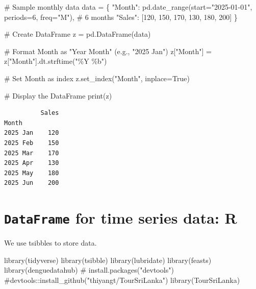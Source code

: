 \documentclass[
  11pt,
  a4paper,
]{report}
\newenvironment{Shaded}{\begin{snugshade}}{\end{snugshade}}
\newcommand{\BuiltInTok}[1]{\textcolor[rgb]{0.00,0.23,0.31}{#1}}
\newcommand{\CommentTok}[1]{\textcolor[rgb]{0.37,0.37,0.37}{#1}}
\newcommand{\DecValTok}[1]{\textcolor[rgb]{0.68,0.00,0.00}{#1}}
\newcommand{\FunctionTok}[1]{\textcolor[rgb]{0.28,0.35,0.67}{#1}}
\newcommand{\NormalTok}[1]{\textcolor[rgb]{0.00,0.23,0.31}{#1}}
\newcommand{\OperatorTok}[1]{\textcolor[rgb]{0.37,0.37,0.37}{#1}}
\newcommand{\StringTok}[1]{\textcolor[rgb]{0.13,0.47,0.30}{#1}}
\newcommand{\VariableTok}[1]{\textcolor[rgb]{0.07,0.07,0.07}{#1}}
\begin{document}
\begin{Shaded}
\begin{Highlighting}[]
\CommentTok{\# Sample monthly data}
\NormalTok{data }\OperatorTok{=}\NormalTok{ \{}
    \StringTok{"Month"}\NormalTok{: pd.date\_range(start}\OperatorTok{=}\StringTok{"2025{-}01{-}01"}\NormalTok{, periods}\OperatorTok{=}\DecValTok{6}\NormalTok{, freq}\OperatorTok{=}\StringTok{"M"}\NormalTok{),  }\CommentTok{\# 6 months}
    \StringTok{"Sales"}\NormalTok{: [}\DecValTok{120}\NormalTok{, }\DecValTok{150}\NormalTok{, }\DecValTok{170}\NormalTok{, }\DecValTok{130}\NormalTok{, }\DecValTok{180}\NormalTok{, }\DecValTok{200}\NormalTok{]}
\NormalTok{\}}

\CommentTok{\# Create DataFrame}
\NormalTok{z }\OperatorTok{=}\NormalTok{ pd.DataFrame(data)}

\CommentTok{\# Format Month as "Year Month" (e.g., "2025 Jan")}
\NormalTok{z[}\StringTok{"Month"}\NormalTok{] }\OperatorTok{=}\NormalTok{ z[}\StringTok{"Month"}\NormalTok{].dt.strftime(}\StringTok{"\%Y \%b"}\NormalTok{)}

\CommentTok{\# Set Month as index}
\NormalTok{z.set\_index(}\StringTok{"Month"}\NormalTok{, inplace}\OperatorTok{=}\VariableTok{True}\NormalTok{)}

\CommentTok{\# Display the DataFrame}
\BuiltInTok{print}\NormalTok{(z)}
\end{Highlighting}
\end{Shaded}

\begin{verbatim}
          Sales
Month          
2025 Jan    120
2025 Feb    150
2025 Mar    170
2025 Apr    130
2025 May    180
2025 Jun    200
\end{verbatim}

\section{\texorpdfstring{\texttt{DataFrame} for time series data:
R}{DataFrame for time series data: R}}\label{dataframe-for-time-series-data-r}

We use tsibbles to store data.

\begin{Shaded}
\begin{Highlighting}[]
\FunctionTok{library}\NormalTok{(tidyverse)}
\FunctionTok{library}\NormalTok{(tsibble)}
\FunctionTok{library}\NormalTok{(lubridate)}
\FunctionTok{library}\NormalTok{(feasts)}
\FunctionTok{library}\NormalTok{(denguedatahub)}
\CommentTok{\# install.packages("devtools")}
\CommentTok{\#devtools::install\_github("thiyangt/TourSriLanka")}
\FunctionTok{library}\NormalTok{(TourSriLanka)}
\end{Highlighting}
\end{Shaded}
\end{document}
